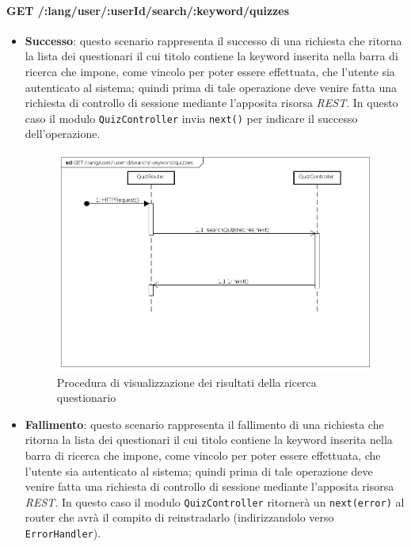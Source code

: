 \paragraph{GET /:lang/user/:userId/search/:keyword/quizzes}
\begin{itemize}
\item \textbf{Successo}: questo scenario rappresenta il successo di una richiesta che ritorna la lista dei questionari il cui titolo contiene la keyword inserita nella barra di ricerca che impone, come vincolo per poter essere effettuata, che l'utente sia autenticato al sistema; quindi prima di tale operazione deve venire fatta una richiesta di controllo di sessione mediante l'apposita risorsa \textit{REST}. In questo caso il modulo \texttt{QuizController} invia \texttt{next()} per indicare il successo dell'operazione.

\begin{figure}[ht]
	\centering
	\includegraphics[scale=0.45]{UML/DiagrammiDiSequenza/Back-end/GET__lang_user__userId_search__keyword_quizzes_success.png}
	\caption{Procedura di visualizzazione dei risultati della ricerca questionario}
\end{figure}
\FloatBarrier

\item \textbf{Fallimento}: questo scenario rappresenta il fallimento di una richiesta che ritorna la lista dei questionari il cui titolo contiene la keyword inserita nella barra di ricerca che impone, come vincolo per poter essere effettuata, che l'utente sia autenticato al sistema; quindi prima di tale operazione deve venire fatta una richiesta di controllo di sessione mediante l'apposita risorsa \textit{REST}. In questo caso il modulo \texttt{QuizController} ritornerà un \texttt{next(error)} al router che avrà il compito di reinstradarlo (indirizzandolo verso \texttt{ErrorHandler}).


\end{itemize}
